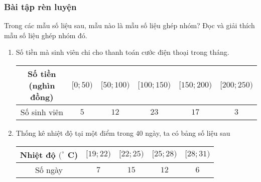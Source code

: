 \subsubsection{Bài tập rèn luyện}
\begin{bt}%
	Trong các mẫu số liệu sau, mẫu nào là mẫu số liệu ghép nhóm? Đọc và giải thích mẫu số liệu ghép nhóm đó.
	\begin{enumerate}
		\item Số tiền mà sinh viên chi cho thanh toán cước điện thoại trong tháng.
		\begin{center}
			\begin{tabular}{|c|c|c|c|c|c|}
				\hline
				Số tiền (nghìn đồng)&$[0;50)$&$[50;100)$&$[100;150)$&$[150;200)$&$[200;250)$\\
				\hline
				Số sinh viên&$5$&$12$&$23$&$17$&$3$\\
				\hline
			\end{tabular}
		\end{center}
		\item Thống kê nhiệt độ tại một điểm trong $40$ ngày, ta có bảng số liệu sau
		\begin{center}
			\begin{tabular}{|c|c|c|c|c|}
				\hline
				Nhiệt độ $(^\circ$ C)&$[19;22)$&$[22;25)$&$[25;28)$&$[28;31)$\\
				\hline
				Số ngày&$7$&$15$&$12$&$6$\\
				\hline
			\end{tabular}
		\end{center}
	\end{enumerate}
\end{bt}	
